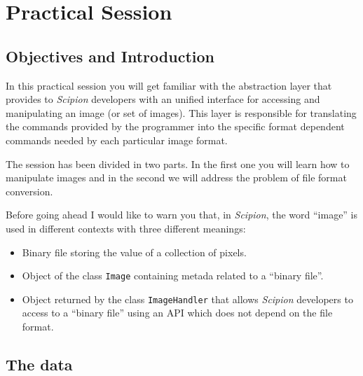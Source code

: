 \documentclass[12pt]{article} %
\def\scipion{\textit{Scipion}\xspace}
\newcommand{\ttt}[1]{\texttt{#1}}
\begin{document}
\section{Practical Session}
\subsection{Objectives and Introduction}


In this practical session you will get familiar with the abstraction layer that provides to \scipion developers with an unified interface for accessing and manipulating an image (or set of images). This layer is responsible for translating the commands provided by the programmer into the specific format dependent commands needed by each particular image format.

The session has been divided in two parts. In the first one you will learn how to manipulate images and in the second we will address the problem of file format conversion.

Before going ahead I would like to warn you that, in \scipion,  the word ``image''  is used in different contexts with three different meanings:

\begin{itemize}
 \item Binary file storing the value of a collection of pixels. 
 \item Object of the class \ttt{Image} containing metada related to a ``binary file''.
 \item Object returned by the class \ttt{ImageHandler} that allows \scipion developers to access to a ``binary file'' using an API which does not depend on the file format.
\end{itemize}

\subsection{The data}
\end{document}
